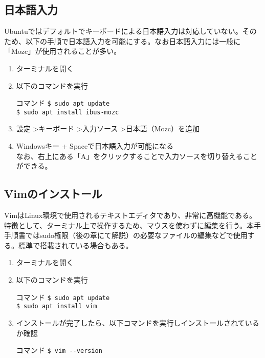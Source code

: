 \documentclass[a4paper, 11pt, dvipdfmx]{jsarticle}
\begin{document}
\subsection{日本語入力}
  Ubuntuではデフォルトでキーボードによる日本語入力は対応していない。そのため、以下の手順で日本語入力を可能にする。なお日本語入力には一般に「Mozc」が使用されることが多い。
  \begin{enumerate}
    \item ターミナルを開く
    \item 以下のコマンドを実行
    \begin{commandbox}{コマンド}
      \verb|$ sudo apt update|\\
      \verb|$ sudo apt install ibus-mozc|
    \end{commandbox}
    \item 設定 \textgreater キーボード \textgreater 入力ソース \textgreater 日本語（Mozc）を追加
    \item Windowsキー + Spaceで日本語入力が可能になる\\
    なお、右上にある「A」をクリックすることで入力ソースを切り替えることができる。
  \end{enumerate}

\subsection{Vimのインストール}
  VimはLinux環境で使用されるテキストエディタであり、非常に高機能である。特徴として、ターミナル上で操作するため、マウスを使わずに編集を行う。本手手順書ではsudo権限（後の章にて解説）の必要なファイルの編集などで使用する。標準で搭載されている場合もある。
  \begin{enumerate}
    \item ターミナルを開く
    \item 以下のコマンドを実行
    \begin{commandbox}{コマンド}
      \verb|$ sudo apt update|\\
      \verb|$ sudo apt install vim|
    \end{commandbox}
    \item インストールが完了したら、以下コマンドを実行しインストールされているか確認
    \begin{commandbox}{コマンド}
      \verb|$ vim --version|
    \end{commandbox}
  \end{enumerate}
\end{document}

